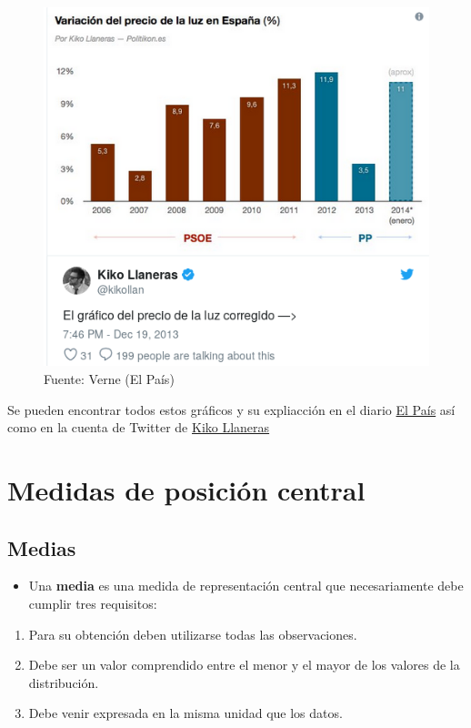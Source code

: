 \documentclass[]{book}
\providecommand{\tightlist}{%
  \setlength{\itemsep}{0pt}\setlength{\parskip}{0pt}}
\theoremstyle{definition}
\theoremstyle{definition}
\theoremstyle{definition}
\theoremstyle{remark}
\begin{document}
\begin{figure}
\centering
\includegraphics{images/grafico_erroneo4bis.png}
\caption{Fuente: Verne (El País)}
\end{figure}

Se pueden encontrar todos estos gráficos y su expliacción en el diario
\href{https://verne.elpais.com/verne/2015/01/23/articulo/1422014607_223837.html}{El
País} así como en la cuenta de Twitter de
\href{https://twitter.com/kikollan}{Kiko Llaneras}

\section{Medidas de posición central}\label{medidas-de-posicion-central}

\subsection{Medias}\label{medias}

\begin{itemize}
\tightlist
\item
  Una \textbf{media} es una medida de representación central que
  necesariamente debe cumplir tres requisitos:
\end{itemize}

\begin{enumerate}
\def\labelenumi{\arabic{enumi}.}
\tightlist
\item
  Para su obtención deben utilizarse todas las observaciones.
\item
  Debe ser un valor comprendido entre el menor y el mayor de los valores
  de la distribución.
\item
  Debe venir expresada en la misma unidad que los datos.
\end{enumerate}
\end{document}
